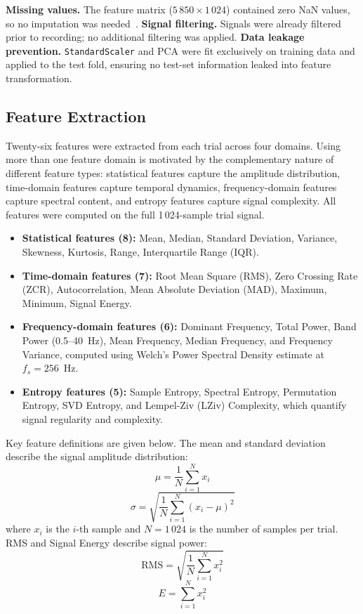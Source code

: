 \documentclass[11pt,a4paper]{article}
\begin{document}
\textbf{Missing values.} The feature matrix ($5\,850 \times 1\,024$) contained zero NaN values, so no imputation was needed~\cite{little2002statistical}. \textbf{Signal filtering.} Signals were already filtered prior to recording; no additional filtering was applied. \textbf{Data leakage prevention.} \texttt{StandardScaler} and PCA were fit exclusively on training data and applied to the test fold, ensuring no test-set information leaked into feature transformation.

\subsection{Feature Extraction}

Twenty-six features were extracted from each trial across four domains. Using more than one feature domain is motivated by the complementary nature of different feature types: statistical features capture the amplitude distribution, time-domain features capture temporal dynamics, frequency-domain features capture spectral content, and entropy features capture signal complexity. All features were computed on the full 1\,024-sample trial signal.

\begin{itemize}
    \item \textbf{Statistical features (8):} Mean, Median, Standard Deviation, Variance, Skewness, Kurtosis, Range, Interquartile Range (IQR).
    \item \textbf{Time-domain features (7):} Root Mean Square (RMS), Zero Crossing Rate (ZCR), Autocorrelation, Mean Absolute Deviation (MAD), Maximum, Minimum, Signal Energy.
    \item \textbf{Frequency-domain features (6):} Dominant Frequency, Total Power, Band Power (0.5--40~Hz), Mean Frequency, Median Frequency, and Frequency Variance, computed using Welch's Power Spectral Density estimate at $f_s = 256$~Hz.
    \item \textbf{Entropy features (5):} Sample Entropy, Spectral Entropy, Permutation Entropy, SVD Entropy, and Lempel-Ziv (LZiv) Complexity, which quantify signal regularity and complexity.
\end{itemize}

Key feature definitions are given below. The mean and standard deviation describe the signal amplitude distribution:
\begin{equation}
\mu = \frac{1}{N} \sum_{i=1}^{N} x_i
\end{equation}
\begin{equation}
\sigma = \sqrt{\frac{1}{N} \sum_{i=1}^{N} (x_i - \mu)^2}
\end{equation}
where $x_i$ is the $i$-th sample and $N = 1\,024$ is the number of samples per trial. RMS and Signal Energy describe signal power:
\begin{equation}
\text{RMS} = \sqrt{\frac{1}{N} \sum_{i=1}^{N} x_i^2}
\end{equation}
\begin{equation}
E = \sum_{i=1}^{N} x_i^2
\end{equation}
\end{document}

